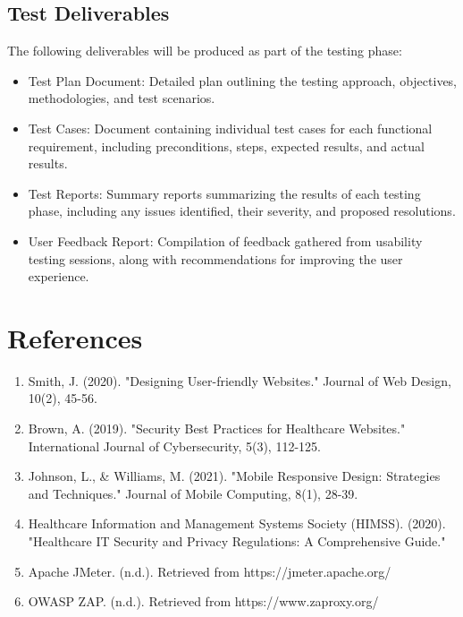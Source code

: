 \documentclass{article}
\begin{document}
\subsection{Test Deliverables}
The following deliverables will be produced as part of the testing phase:
\begin{itemize}
    \item Test Plan Document: Detailed plan outlining the testing approach, objectives, methodologies, and test scenarios.
    \item Test Cases: Document containing individual test cases for each functional requirement, including preconditions, steps, expected results, and actual results.
    \item Test Reports: Summary reports summarizing the results of each testing phase, including any issues identified, their severity, and proposed resolutions.
    \item User Feedback Report: Compilation of feedback gathered from usability testing sessions, along with recommendations for improving the user experience.
\end{itemize}


\clearpage

\section{References} \label{sec:references}

\begin{enumerate}
    \item Smith, J. (2020). "Designing User-friendly Websites." Journal of Web Design, 10(2), 45-56.
    
    \item Brown, A. (2019). "Security Best Practices for Healthcare Websites." International Journal of Cybersecurity, 5(3), 112-125.
    
    \item Johnson, L., \& Williams, M. (2021). "Mobile Responsive Design: Strategies and Techniques." Journal of Mobile Computing, 8(1), 28-39.
    
    \item Healthcare Information and Management Systems Society (HIMSS). (2020). "Healthcare IT Security and Privacy Regulations: A Comprehensive Guide."
    
    \item Apache JMeter. (n.d.). Retrieved from https://jmeter.apache.org/
    
    \item OWASP ZAP. (n.d.). Retrieved from https://www.zaproxy.org/
\end{enumerate}

\end{document}
